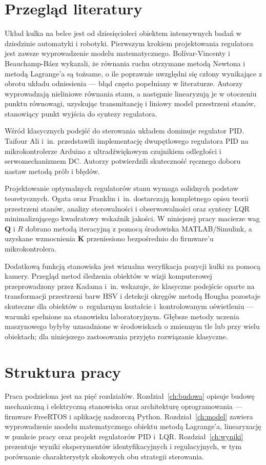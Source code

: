 \section{Przegląd literatury}

Układ kulka na belce jest od dziesięcioleci obiektem intensywnych badań w dziedzinie
automatyki i robotyki.
Pierwszym krokiem projektowania regulatora jest zawsze wyprowadzenie modelu matematycznego.
Bolívar-Vincenty i Beauchamp-Báez \cite{bolivar2014modelling} wykazali, że równania ruchu
otrzymane metodą Newtona i metodą Lagrange'a są tożsame, o ile poprawnie uwzględni się
człony wynikające z obrotu układu odniesienia — błąd często popełniany w literaturze.
Autorzy wyprowadzają nieliniowe równania stanu, a następnie linearyzują je w otoczeniu
punktu równowagi, uzyskując transmitancję i liniowy model przestrzeni stanów, stanowiący
punkt wyjścia do syntezy regulatora.

Wśród klasycznych podejść do sterowania układem dominuje regulator PID.
Taifour Ali i~in. \cite{taifour2017design} przedstawili implementację dwupętlowego
regulatora PID na mikrokontrolerze Arduino z ultradźwiękowym czujnikiem odległości
i serwomechanizmem DC.
Autorzy potwierdzili skuteczność ręcznego doboru nastaw metodą prób i błędów.

Projektowanie optymalnych regulatorów stanu wymaga solidnych podstaw teoretycznych.
Ogata \cite{ogata2010modern} oraz Franklin i~in. \cite{franklin2014feedback} dostarczają
kompletnego opisu teorii przestrzeni stanów, analizy sterowalności i obserwowalności
oraz syntezy LQR minimalizującego kwadratowy wskaźnik jakości.
W niniejszej pracy macierze wag $\mathbf{Q}$ i $R$ dobrano metodą iteracyjną
z pomocą środowiska MATLAB/Simulink, a uzyskane wzmocnienia $\mathbf{K}$ przeniesiono
bezpośrednio do firmware'u mikrokontrolera.

Dodatkową funkcją stanowiska jest wizualna weryfikacja pozycji kulki za pomocą kamery.
Przegląd metod śledzenia obiektów w wizji komputerowej przeprowadzony przez
Kadama i~in. \cite{kadam2024object} wskazuje, że klasyczne podejście oparte na transformacji
przestrzeni barw HSV i detekcji okręgów metodą Hougha pozostaje skuteczne dla
obiektów o~regularnym kształcie i~kontrolowanym oświetleniu — warunki spełnione
na stanowisku laboratoryjnym.
Głębsze metody uczenia maszynowego byłyby uzasadnione w środowiskach o zmiennym tle
lub przy wielu obiektach; dla niniejszego zastosowania przyjęto rozwiązanie klasyczne.

\section{Struktura pracy}

Praca podzielona jest na pięć rozdziałów.
Rozdział~\ref{ch:budowa} opisuje budowę mechaniczną i elektryczną stanowiska
oraz architekturę oprogramowania — firmware FreeRTOS i aplikację nadzorczą Python.
Rozdział~\ref{ch:model} zawiera wyprowadzenie modelu matematycznego obiektu
metodą Lagrange'a, linearyzację w punkcie pracy oraz projekt regulatorów PID i~LQR.
Rozdział~\ref{ch:wyniki} prezentuje wyniki eksperymentów identyfikacyjnych i regulacyjnych,
w tym porównanie charakterystyk skokowych obu strategii sterowania.

